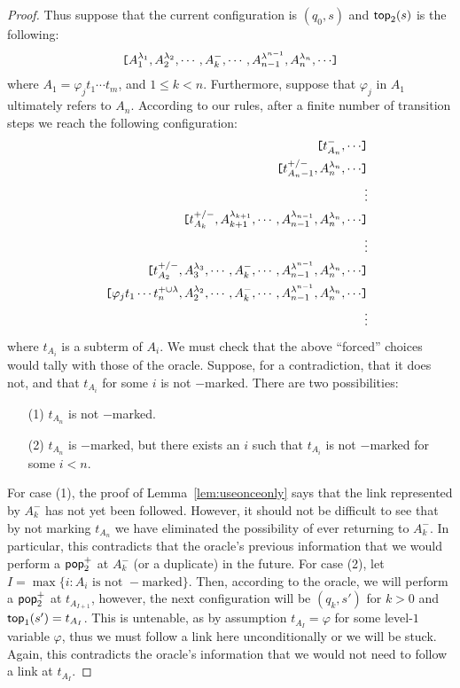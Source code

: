 \begin{proof}
Thus suppose that the current configuration is $(q_0, s)$ and
${\sf top}_2(s)$ is the following:
\begin{equation}
\nonumber \hbox{\tt [}{A_1^{\lambda_1}, A_2^{\lambda_2}, \cdots, A_k^-,
\cdots, A_{n-1}^{\lambda^{n-1}}, A_n^{\lambda_n}, \cdots}\hbox{\tt ]}
\end{equation}
where $A_1 = \varphi_j t_1 \cdots t_m$, and $1\leq k < n$.
Furthermore, suppose that $\varphi_j$ in $A_1$ ultimately refers to
$A_n$. According to our rules, after a finite number of transition
steps we reach the following configuration:
\begin{eqnarray}
\nonumber && \hbox{\tt [}{t_{A_n}^{-}, \cdots }\hbox{\tt ]} \\
\nonumber && \hbox{\tt [}{t_{A_n-1}^{+/-}, A_n^{\lambda_n} , \cdots}\hbox{\tt ]}  \\
\nonumber && \vdots \\
\nonumber && \hbox{\tt [}{t_{A_k}^{+/-}, A_{k+1}^{\lambda_{k+1}}, \cdots, A_{n-1}^{\lambda_{n-1}}, A_n^{\lambda_n}, \cdots}\hbox{\tt ]}\\
\nonumber && \vdots \\
\nonumber && \hbox{\tt [}{t_{A_2}^{+/-},  A_3^{\lambda_3}, \cdots,  A_k^-, \cdots, A_{n-1}^{\lambda^{n-1}}, A_n^{\lambda_n},\cdots}\hbox{\tt ]}\\
\nonumber && \hbox{\tt [}{\varphi_j t_1 \cdots t_n^{+ \cup \lambda}, A_2^{\lambda_2}, \cdots, A_k^-, \cdots, A_{n-1}^{\lambda^{n-1}},A_n^{\lambda_n},\cdots}\hbox{\tt ]}\\
\nonumber && \vdots
\end{eqnarray}
where $t_{A_i}$ is a subterm of $A_i$. We must check that the above
``forced'' choices would tally with those of the oracle. Suppose, for
a contradiction, that it does not, and that $t_{A_i}$ for some $i$ is
not $-$marked. There are two possibilities:
\begin{enumerate}
\item[(1)] $t_{A_n}$ is not $-$marked.
\item[(2)] $t_{A_n}$ is $-$marked,
but there exists an $i$ such that $t_{A_i}$ is not $-$marked for
some $i < n$.
\end{enumerate}
For case (1), the proof of Lemma~\ref{lem:useonceonly} says that
the link represented by $A_k^-$ has not yet been followed.
However, it should not be difficult to see that by not marking
$t_{A_n}$ we have eliminated the possibility of ever returning to
$A_k^-$. In particular, this contradicts that the oracle's
previous information that we would perform a ${\sf pop}_2^+$ at $A_k^-$
(or a duplicate) in the future. For case (2), let $I = \max \{i :
\mbox{$A_i$ is not $-$marked}\}$. Then, according to the oracle,
we will perform a ${\sf pop}_2^+$ at $t_{A_{I+1}}$, however, the next
configuration will be $(q_k, s')$ for $k>0$ and ${\sf top}_1(s') =
t_{A_I}$. This is untenable, as by assumption $t_{A_I} = \varphi$
for some level-$1$ variable $\varphi$, thus we must follow a link
here unconditionally or we will be stuck. Again, this contradicts
the oracle's information that we would not need to follow a link
at $t_{A_I}$.
\end{proof}

